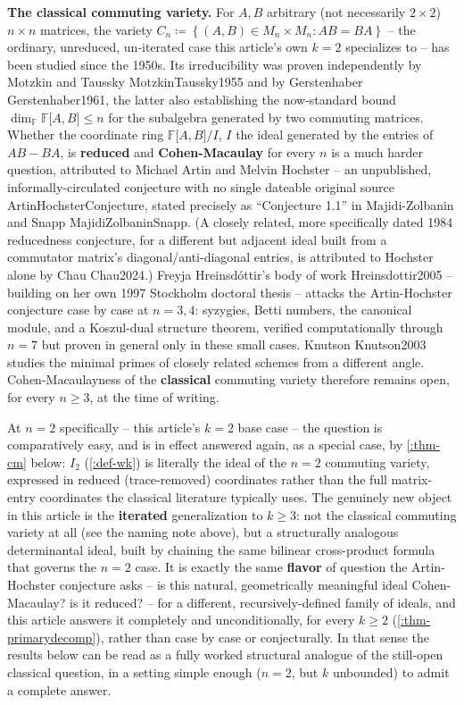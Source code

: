 \documentclass[a4paper,11pt]{scrartcl}
\begin{document}
\textbf{The classical commuting variety.} For \(A,B\) arbitrary (not necessarily \(2 \times 2\)) \(n \times n\) matrices, the variety \(C_{n} ≔ \left\{ (A,B) \in M_{n} \times M_{n}:AB = BA \right\}\) -- the ordinary, unreduced, un-iterated case this article's own \(k = 2\) specializes to -- has been studied since the 1950s. Its irreducibility was proven independently by Motzkin and Taussky MotzkinTaussky1955 and by Gerstenhaber Gerstenhaber1961, the latter also establishing the now-standard bound \(\dim_{\mathbb{F}}\mathbb{F}\lbrack A,B\rbrack \leq n\) for the subalgebra generated by two commuting matrices. Whether the coordinate ring \(\mathbb{F}\lbrack A,B\rbrack/I\), \(I\) the ideal generated by the entries of \(AB - BA\), is \textbf{reduced} and \textbf{Cohen-Macaulay} for every \(n\) is a much harder question, attributed to Michael Artin and Melvin Hochster -- an unpublished, informally-circulated conjecture with no single dateable original source ArtinHochsterConjecture, stated precisely as ``Conjecture 1.1'' in Majidi-Zolbanin and Snapp MajidiZolbaninSnapp. (A closely related, more specifically dated 1984 reducedness conjecture, for a different but adjacent ideal built from a commutator matrix's diagonal/anti-diagonal entries, is attributed to Hochster alone by Chau Chau2024.) Freyja Hreinsdóttir's body of work Hreinsdottir2005 -- building on her own 1997 Stockholm doctoral thesis -- attacks the Artin-Hochster conjecture case by case at \(n = 3,4\): syzygies, Betti numbers, the canonical module, and a Koszul-dual structure theorem, verified computationally through \(n = 7\) but proven in general only in these small cases. Knutson Knutson2003 studies the minimal primes of closely related schemes from a different angle. Cohen-Macaulayness of the \textbf{classical} commuting variety therefore remains open, for every \(n \geq 3\), at the time of writing.

At \(n = 2\) specifically -- this article's \(k = 2\) base case -- the question is comparatively easy, and is in effect answered again, as a special case, by \cref{:thm-cm} below: \(I_{2}\) (\cref{:def-wk}) is literally the ideal of the \(n = 2\) commuting variety, expressed in reduced (trace-removed) coordinates rather than the full matrix-entry coordinates the classical literature typically uses. The genuinely new object in this article is the \textbf{iterated} generalization to \(k \geq 3\): not the classical commuting variety at all (see the naming note above), but a structurally analogous determinantal ideal, built by chaining the same bilinear cross-product formula that governs the \(n = 2\) case. It is exactly the same \textbf{flavor} of question the Artin-Hochster conjecture asks -- is this natural, geometrically meaningful ideal Cohen-Macaulay? is it reduced? -- for a different, recursively-defined family of ideals, and this article answers it completely and unconditionally, for every \(k \geq 2\) (\cref{:thm-primarydecomp}), rather than case by case or conjecturally. In that sense the results below can be read as a fully worked structural analogue of the still-open classical question, in a setting simple enough (\(n = 2\), but \(k\) unbounded) to admit a complete answer.
\end{document}
